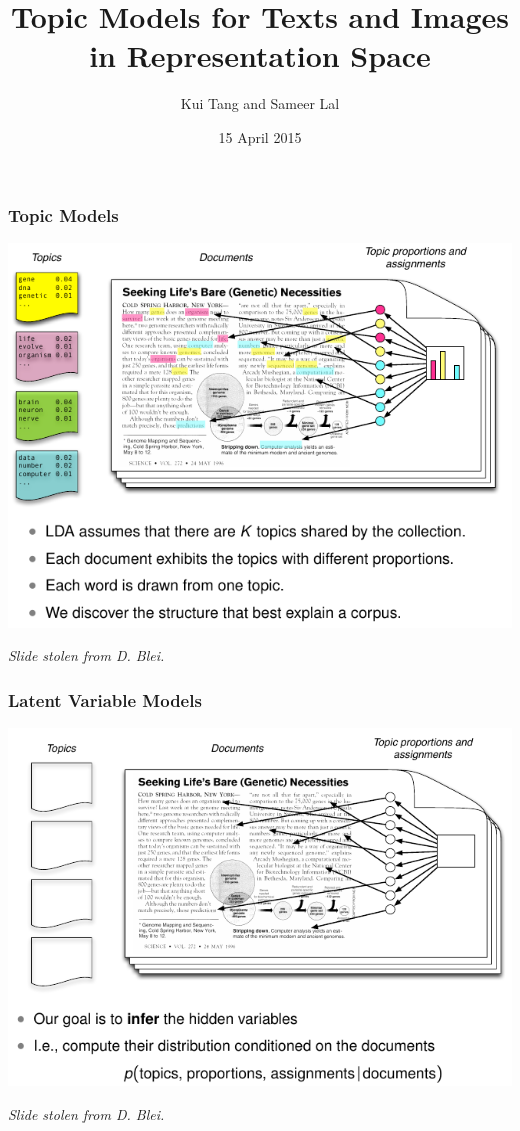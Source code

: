 \documentclass{beamer}
\title{Topic Models for Texts and Images in Representation Space}
\author{Kui Tang and Sameer Lal}
\institute{Columbia University}
\date{15 April 2015}
\begin{document}
\frame{\titlepage}

\begin{frame}
  \frametitle{Topic Models}
  {\centering \includegraphics[width=\textwidth]{assets/lda_colors.pdf}}
  {\small \emph{Slide stolen from D. Blei.} \par}
\end{frame}

\begin{frame}
  \frametitle{Latent Variable Models}
  {\centering \includegraphics[width=\textwidth]{assets/lda_hidden.pdf}}
  {\small \emph{Slide stolen from D. Blei.} \par}
\end{frame}
\end{document}
